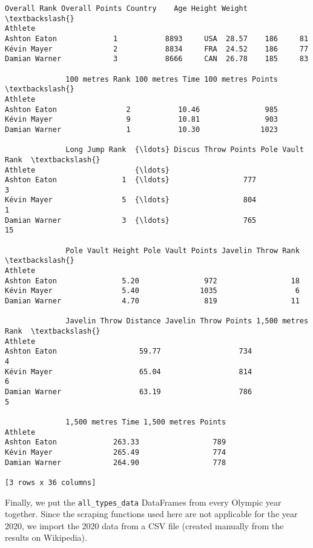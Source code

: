 \documentclass[11pt]{article}
\makeatletter
\newcommand{\boxspacing}{\kern\kvtcb@left@rule\kern\kvtcb@boxsep}
\newcommand{\prompt}[4]{
        {\ttfamily\llap{{\color{#2}[#3]:\hspace{3pt}#4}}\vspace{-\baselineskip}}
    }
\makeatother
\begin{document}
            \begin{tcolorbox}[breakable, size=fbox, boxrule=.5pt, pad at break*=1mm, opacityfill=0]
\prompt{Out}{outcolor}{34}{\boxspacing}
\begin{Verbatim}[commandchars=\\\{\}]
              Overall Rank Overall Points Country    Age Height Weight  \textbackslash{}
Athlete
Ashton Eaton             1           8893     USA  28.57    186     81
Kévin Mayer              2           8834     FRA  24.52    186     77
Damian Warner            3           8666     CAN  26.78    185     83

              100 metres Rank 100 metres Time 100 metres Points  \textbackslash{}
Athlete
Ashton Eaton                2           10.46               985
Kévin Mayer                 9           10.81               903
Damian Warner               1           10.30              1023

              Long Jump Rank  {\ldots} Discus Throw Points Pole Vault Rank  \textbackslash{}
Athlete                       {\ldots}
Ashton Eaton               1  {\ldots}                 777               3
Kévin Mayer                5  {\ldots}                 804               1
Damian Warner              3  {\ldots}                 765              15

              Pole Vault Height Pole Vault Points Javelin Throw Rank  \textbackslash{}
Athlete
Ashton Eaton               5.20               972                 18
Kévin Mayer                5.40              1035                  6
Damian Warner              4.70               819                 11

              Javelin Throw Distance Javelin Throw Points 1,500 metres Rank  \textbackslash{}
Athlete
Ashton Eaton                   59.77                  734                 4
Kévin Mayer                    65.04                  814                 6
Damian Warner                  63.19                  786                 5

              1,500 metres Time 1,500 metres Points
Athlete
Ashton Eaton             263.33                 789
Kévin Mayer              265.49                 774
Damian Warner            264.90                 778

[3 rows x 36 columns]
\end{Verbatim}
\end{tcolorbox}
        
    Finally, we put the \texttt{all\_types\_data} DataFrames from every
Olympic year together. Since the scraping functions used here are not
applicable for the year 2020, we import the 2020 data from a CSV file
(created manually from the results on Wikipedia).
\end{document}
